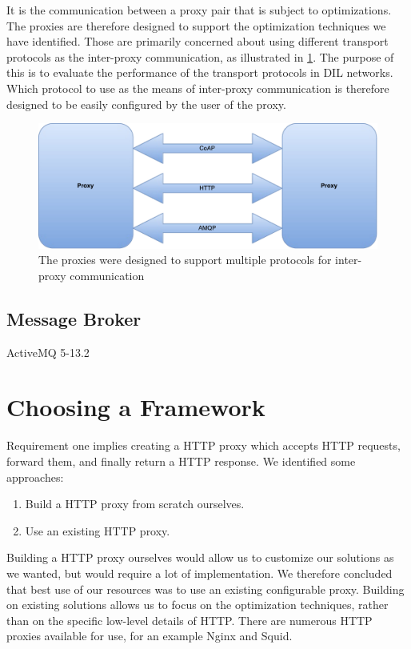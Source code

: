 It is the communication between a proxy pair that is subject to optimizations.
The proxies are therefore designed to support the optimization techniques we
have identified. Those are primarily concerned about using different transport
protocols as the inter-proxy communication, as illustrated in
\cref{figure:proxy-communication}. The purpose of this is to evaluate the
performance of the transport protocols in DIL networks. Which protocol to use as
the means of inter-proxy communication is therefore designed to be easily
configured by the user of the proxy.

\begin{figure}[h]
\includegraphics[scale=0.5]{images/proxy_communcation.pdf}
\caption{The proxies were designed to support multiple protocols for inter-proxy communication}
\label{figure:proxy-communication}
\end{figure}

\subsection{Message Broker}

ActiveMQ 5-13.2

\section{Choosing a Framework}

Requirement one implies creating a HTTP proxy which accepts HTTP requests,
forward them, and finally return a HTTP response. We identified some approaches:

\begin{enumerate}
    \item Build a HTTP proxy from scratch ourselves.
    \item Use an existing HTTP proxy.
\end{enumerate}

Building a HTTP proxy ourselves would allow us to customize our solutions as we
wanted, but would require a lot of implementation. We therefore concluded that
best use of our resources was to use an existing configurable proxy.
Building on existing solutions allows us to focus on the optimization techniques,
rather than on the specific low-level details of HTTP.
There are numerous HTTP proxies available for use, for an example Nginx and Squid.

